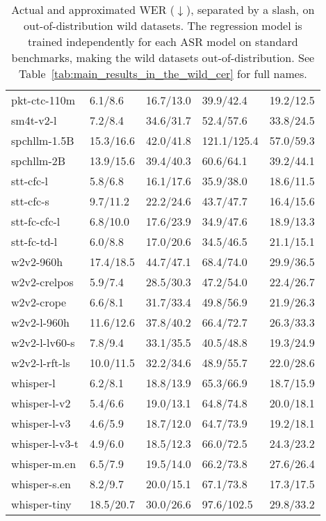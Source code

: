 \begin{table}[!hbt]
{\begin{tabular}{p{3cm}p{2cm}p{2cm}p{2cm}p{2cm}}
pkt-ctc-110m       & 6.1/8.6   & 16.7/13.0 & 39.9/42.4   & 19.2/12.5    \\
sm4t-v2-l          & 7.2/8.4   & 34.6/31.7 & 52.4/57.6   & 33.8/24.5    \\
spchllm-1.5B       & 15.3/16.6 & 42.0/41.8 & 121.1/125.4 & 57.0/59.3    \\
spchllm-2B         & 13.9/15.6 & 39.4/40.3 & 60.6/64.1   & 39.2/44.1    \\
stt-cfc-l          & 5.8/6.8   & 16.1/17.6 & 35.9/38.0   & 18.6/11.5    \\
stt-cfc-s          & 9.7/11.2  & 22.2/24.6 & 43.7/47.7   & 16.4/15.6    \\
stt-fc-cfc-l       & 6.8/10.0  & 17.6/23.9 & 34.9/47.6   & 18.9/13.3    \\
stt-fc-td-l        & 6.0/8.8   & 17.0/20.6 & 34.5/46.5   & 21.1/15.1    \\
w2v2-960h          & 17.4/18.5 & 44.7/47.1 & 68.4/74.0   & 29.9/36.5    \\
w2v2-crelpos       & 5.9/7.4   & 28.5/30.3 & 47.2/54.0   & 22.4/26.7    \\
w2v2-crope         & 6.6/8.1   & 31.7/33.4 & 49.8/56.9   & 21.9/26.3    \\
w2v2-l-960h        & 11.6/12.6 & 37.8/40.2 & 66.4/72.7   & 26.3/33.3    \\
w2v2-l-lv60-s   & 7.8/9.4   & 33.1/35.5 & 40.5/48.8   & 19.3/24.9    \\
w2v2-l-rft-ls      & 10.0/11.5 & 32.2/34.6 & 48.9/55.7   & 22.0/28.6    \\
whisper-l          & 6.2/8.1   & 18.8/13.9 & 65.3/66.9   & 18.7/15.9    \\
whisper-l-v2       & 5.4/6.6   & 19.0/13.1 & 64.8/74.8   & 20.0/18.1    \\
whisper-l-v3       & 4.6/5.9   & 18.7/12.0 & 64.7/73.9   & 19.2/18.1    \\
whisper-l-v3-t & 4.9/6.0   & 18.5/12.3 & 66.0/72.5   & 24.3/23.2    \\
whisper-m.en       & 6.5/7.9   & 19.5/14.0 & 66.2/73.8   & 27.6/26.4    \\
whisper-s.en       & 8.2/9.7   & 20.0/15.1 & 67.1/73.8   & 17.3/17.5    \\
whisper-tiny       & 18.5/20.7 & 30.0/26.6 & 97.6/102.5  & 29.8/33.2   \\ 
\bottomrule
\end{tabular}
}
\caption{Actual and approximated WER ($\downarrow$), separated by a slash, on out-of-distribution wild datasets. The regression model is trained independently for each ASR model on standard benchmarks, making the wild datasets out-of-distribution. See Table~\ref{tab:main_results_in_the_wild_cer} for full names.}
\label{tab:main_results_in_the_wild}
\end{table}